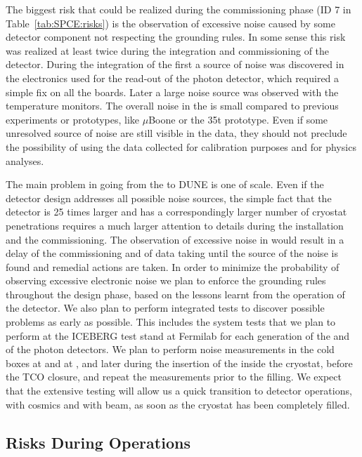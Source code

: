 The biggest risk that could be realized during the commissioning phase
(ID 7 in Table~\ref{tab:SPCE:risks}) is the observation of excessive noise 
caused by some detector component not respecting the  grounding
rules. In some sense this risk was realized at least twice during the 
integration and commissioning of the  detector. During the 
integration of the first  a source of noise was discovered 
in the electronics used for the read-out of the photon  detector, which 
required a simple fix on all the boards. Later a large noise source was 
observed with the temperature monitors. The overall noise in the  
is small compared to previous  experiments or prototypes, 
like $\mu$Boone or the 35t prototype. Even if some unresolved source of noise 
are still visible in the  data, they should not preclude the 
possibility of using the data collected for calibration purposes and for 
physics analyses. 

The main problem in going from the  to DUNE is one of scale.
Even if the detector design addresses all possible noise sources, the simple
fact that the detector is 25 times larger and has a correspondingly larger
number of cryostat penetrations requires a much larger attention to details
during the installation and the commissioning. The observation of excessive 
noise in  would result in a delay of the commissioning and of 
data taking until the source of the noise is found and remedial actions 
are taken. In order to minimize the probability of observing excessive 
electronic noise we plan to enforce the grounding  rules throughout the 
design phase, based on the lessons learnt from the operation of the 
 detector. We also plan to perform  integrated tests to discover 
possible problems as early as possible. This includes the system tests that 
we plan to perform at the ICEBERG test stand at Fermilab for each generation 
of the  and of the photon detectors. We plan to perform noise 
measurements in the cold boxes at  and at \surf, and later 
during the insertion of the  inside the cryostat, before the 
TCO closure, and repeat the measurements prior to the  filling. 
We expect that the extensive testing will allow us a quick transition to 
detector operations, with cosmics and with beam, as soon as the cryostat 
has been completely filled. 

\subsection{Risks During Operations}
\label{sec:fdsp-tpcelec-risks-operations}

